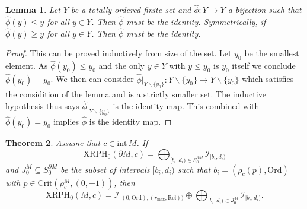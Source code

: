 \documentclass[a4paper,11pt]{article}
\newtheorem{theorem}{Theorem}[section]
\newtheorem{lemma}[theorem]{Lemma}
\theoremstyle{definition}
\begin{document}
\begin{lemma}\label{lem:identity}
Let $Y$ be a totally ordered finite set and $\hat{\phi}:Y\to Y$ a bijection such that $\hat{\phi}(y)\leq y$ for all $y\in Y$. Then $\hat{\phi}$ must be the identity. 
Symmetrically, if $\hat{\phi}(y)\geq y$ for all $y\in Y$. Then $\hat{\phi}$ must be the identity. 
\end{lemma}
\begin{proof}
This can be proved inductively from size of the set. Let $y_0$ be the smallest element. As $\hat{\phi}(y_0)\leq y_0$ and the only $y\in Y$ with $y\leq y_0$ is $y_0$ itself we conclude $\hat{\phi}(y_0)=y_0$. We then can consider $\hat{\phi}|_{Y\backslash \{y_0\}}:Y\backslash \{y_0\} \to Y\backslash \{y_0\}$ which satisfies the considition of the lemma and is a strictly smaller set. The inductive hypothesis thus says   $\hat{\phi}|_{Y\backslash \{y_0\}}$ is the identity map. This combined with $\hat{\phi}(y_0)=y_0$ implies $\hat{\phi}$ is the identity map.
\end{proof}

\begin{theorem}\label{thm:0cinM}
Assume that $c\in \text{int}\,M$. If $$\text{XRPH}_0(\partial M, c) = \bigoplus_{[b_i,d_i)\in S_0^{\partial M}} \mathcal{I}_{[b_i,d_i)}$$ and $J_0^M\subseteq S_0^{\partial M}$ be the subset of intervals $[b_i,d_i)$ such that $b_i = (\rho_c(p),\text{Ord})$ with $p\in\text{Crit}(\rho_c^M,(0,+1))$,
then $$\text{XRPH}_0(M,c) = \mathcal{I}_{[(0,\text{Ord}),(r_{\max},\text{Rel}))}\oplus \bigoplus_{[b_i,d_i)\in J^M_0} \mathcal{I}_{[b_i,d_i)}.$$
\end{theorem}
\end{document}
